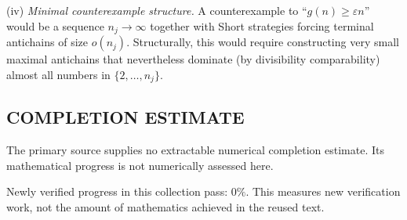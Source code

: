 \noindent(iv) \emph{Minimal counterexample structure.}
A counterexample to ``$g(n)\ge \varepsilon n$'' would be a sequence $n_j\to\infty$ together with Short strategies forcing terminal antichains of size $o(n_j)$. Structurally, this would require constructing very small maximal antichains that nevertheless dominate (by divisibility comparability) almost all numbers in $\{2,\dots,n_j\}$.




\subsection*{COMPLETION ESTIMATE}
The primary source supplies no extractable numerical completion estimate. Its mathematical progress is not numerically assessed here.

Newly verified progress in this collection pass: $0\%$. This measures new verification work, not the amount of mathematics achieved in the reused text.
